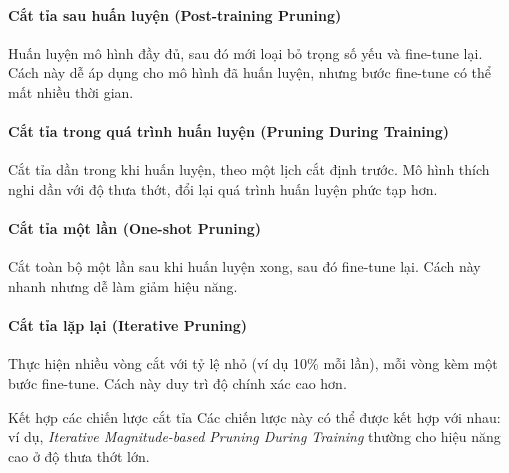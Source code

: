 \paragraph{Cắt tỉa sau huấn luyện (Post-training Pruning)}
Huấn luyện mô hình đầy đủ, sau đó mới loại bỏ trọng số yếu và fine-tune lại. Cách này dễ áp dụng cho mô hình đã huấn luyện, nhưng bước fine-tune có thể mất nhiều thời gian.

\paragraph{Cắt tỉa trong quá trình huấn luyện (Pruning During Training)}
Cắt tỉa dần trong khi huấn luyện, theo một lịch cắt định trước. Mô hình thích nghi dần với độ thưa thớt, đổi lại quá trình huấn luyện phức tạp hơn.

\paragraph{Cắt tỉa một lần (One-shot Pruning)}
Cắt toàn bộ một lần sau khi huấn luyện xong, sau đó fine-tune lại. Cách này nhanh nhưng dễ làm giảm hiệu năng.

\paragraph{Cắt tỉa lặp lại (Iterative Pruning)}
Thực hiện nhiều vòng cắt với tỷ lệ nhỏ (ví dụ 10\% mỗi lần), mỗi vòng kèm một bước fine-tune. Cách này duy trì độ chính xác cao hơn.

\begin{assess}{Kết hợp các chiến lược cắt tỉa}
	Các chiến lược này có thể được kết hợp với nhau: ví dụ, \textit{Iterative Magnitude-based Pruning During Training} thường cho hiệu năng cao ở độ thưa thớt lớn.
\end{assess}
